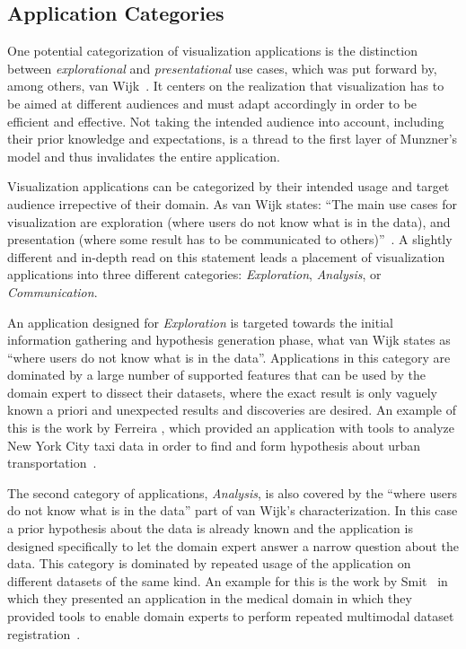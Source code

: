 \subsection{Application Categories} \label{cha:intro:appl:categories}
One potential categorization of visualization applications is the distinction between \emph{explorational} and \emph{presentational} use cases, which was put forward by, among others, van Wijk~\cite{van2005value}.  It centers on the realization that visualization has to be aimed at different audiences and must adapt accordingly in order to be efficient and effective.  Not taking the intended audience into account, including their prior knowledge and expectations, is a thread to the first layer of Munzner's model and thus invalidates the entire application.

Visualization applications can be categorized by their intended usage and target audience irrepective of their domain. As van Wijk states: ``The main use cases for visualization are exploration (where users do not know what is in the data), and presentation (where some result has to be communicated to others)''~\cite{van2005value}.  A slightly different and in-depth read on this statement leads a placement of visualization applications into three different categories: \emph{Exploration}, \emph{Analysis}, or \emph{Communication}.

An application designed for \emph{Exploration} is targeted towards the initial information gathering and hypothesis generation phase, what van Wijk states as ``where users do not know what is in the data''.  Applications in this category are dominated by a large number of supported features that can be used by the domain expert to dissect their datasets, where the exact result is only vaguely known a priori and unexpected results and discoveries are desired.  An example of this is the work by Ferreira \etal , which provided an application with tools to analyze New York City taxi data in order to find and form hypothesis about urban transportation~\cite{ferreira2013visual}.

The second category of applications, \emph{Analysis}, is also covered by the ``where users do not know what is in the data'' part of van Wijk's characterization.  In this case a prior hypothesis about the data is already known and the application is designed specifically to let the domain expert answer a narrow question about the data.  This category is dominated by repeated usage of the application on different datasets of the same kind.  An example for this is the work by Smit \etal\ in which they presented an application in the medical domain in which they provided tools to enable domain experts to perform repeated multimodal dataset registration~\cite{smit14registrationshop}.

